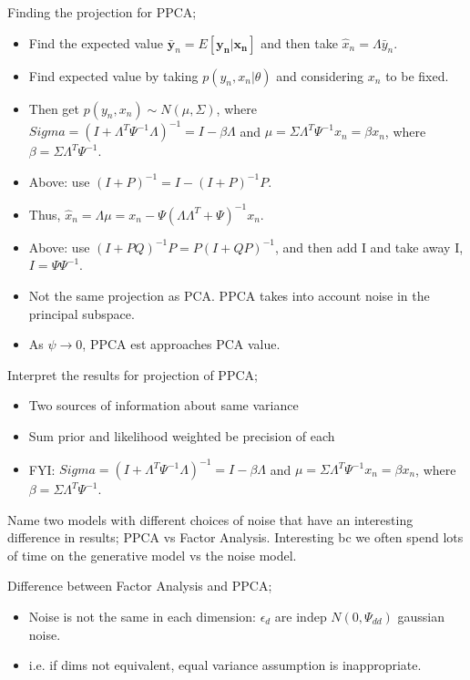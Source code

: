 \documentclass{article}
\begin{document}
Finding the projection for PPCA; \begin{itemize} \item Find the expected value $\mathbf{\bar{y}}_n=E[\mathbf{y_n|x_n}]$ and then take $\hat{x}_n=\Lambda\bar{y}_n$.  \item Find expected value by taking $p(y_n, x_n|\theta)$ and considering $x_n$ to be fixed.  \item Then get $p(y_n, x_n) \sim N(\mu, \Sigma)$, where $Sigma = (I+\Lambda^T\Psi^{-1}\Lambda)^{-1}=I-\beta\Lambda$ and $\mu=\Sigma\Lambda^T\Psi^{-1}x_n=\beta x_n$, where $\beta = \Sigma\Lambda^T\Psi^{-1}$.  \item Above: use $(I+P)^{-1}=I-(I+P)^{-1}P$.  \item Thus, $\hat{x}_n=\Lambda\mu=x_n - \Psi(\Lambda\Lambda^T+\Psi)^{-1}x_n$.  \item Above: use $(I+PQ)^{-1}P=P(I+QP)^{-1}$, and then add I and take away I, $I=\Psi\Psi^{-1}$.  \item Not the same projection as PCA. PPCA takes into account noise in the principal subspace.  \item As $\psi\rightarrow 0$, PPCA est approaches PCA value.  \end{itemize}

Interpret the results for projection of PPCA; \begin{itemize} \item Two sources of information about same variance \item Sum prior and likelihood weighted be precision of each \item FYI: $Sigma = (I+\Lambda^T\Psi^{-1}\Lambda)^{-1}=I-\beta\Lambda$ and $\mu=\Sigma\Lambda^T\Psi^{-1}x_n=\beta x_n$, where $\beta = \Sigma\Lambda^T\Psi^{-1}$.	\end{itemize}

Name two models with different choices of noise that have an interesting difference in results; PPCA vs Factor Analysis. \newline Interesting bc we often spend lots of time on the generative model vs the noise model.

Difference between Factor Analysis and PPCA; \begin{itemize} \item Noise is not the same in each dimension: $\epsilon_d$ are indep $N(0,\Psi_{dd})$ gaussian noise.  \item i.e. if dims not equivalent, equal variance assumption is inappropriate.  \end{itemize}
\end{document}
